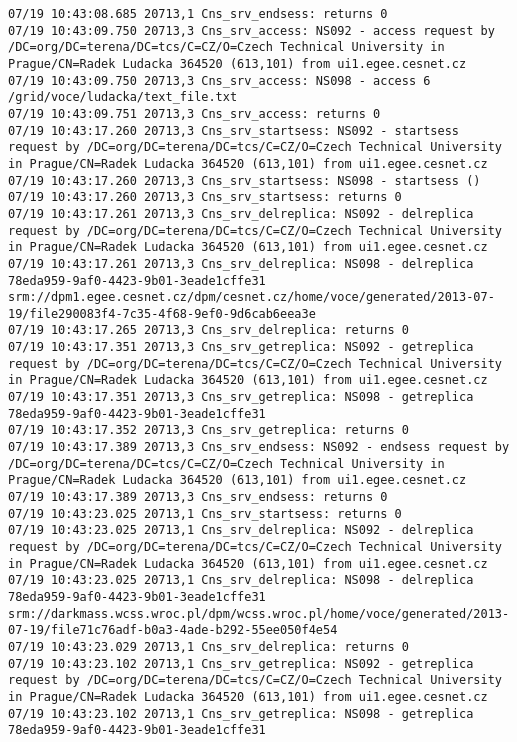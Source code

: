 \documentclass[a4paper, 11pt]{article} %
\begin{document}
\begin{lstlisting}[label={log:del3},caption={lcg-del -a lfn:/grid/voce/ludacka/text\_file.txt - deletes all replicas and alisses. In this example: deletes 2 replicas}]
07/19 10:43:08.685 20713,1 Cns_srv_endsess: returns 0
07/19 10:43:09.750 20713,3 Cns_srv_access: NS092 - access request by /DC=org/DC=terena/DC=tcs/C=CZ/O=Czech Technical University in Prague/CN=Radek Ludacka 364520 (613,101) from ui1.egee.cesnet.cz
07/19 10:43:09.750 20713,3 Cns_srv_access: NS098 - access 6 /grid/voce/ludacka/text_file.txt
07/19 10:43:09.751 20713,3 Cns_srv_access: returns 0
07/19 10:43:17.260 20713,3 Cns_srv_startsess: NS092 - startsess request by /DC=org/DC=terena/DC=tcs/C=CZ/O=Czech Technical University in Prague/CN=Radek Ludacka 364520 (613,101) from ui1.egee.cesnet.cz
07/19 10:43:17.260 20713,3 Cns_srv_startsess: NS098 - startsess ()
07/19 10:43:17.260 20713,3 Cns_srv_startsess: returns 0
07/19 10:43:17.261 20713,3 Cns_srv_delreplica: NS092 - delreplica request by /DC=org/DC=terena/DC=tcs/C=CZ/O=Czech Technical University in Prague/CN=Radek Ludacka 364520 (613,101) from ui1.egee.cesnet.cz
07/19 10:43:17.261 20713,3 Cns_srv_delreplica: NS098 - delreplica 78eda959-9af0-4423-9b01-3eade1cffe31 srm://dpm1.egee.cesnet.cz/dpm/cesnet.cz/home/voce/generated/2013-07-19/file290083f4-7c35-4f68-9ef0-9d6cab6eea3e
07/19 10:43:17.265 20713,3 Cns_srv_delreplica: returns 0
07/19 10:43:17.351 20713,3 Cns_srv_getreplica: NS092 - getreplica request by /DC=org/DC=terena/DC=tcs/C=CZ/O=Czech Technical University in Prague/CN=Radek Ludacka 364520 (613,101) from ui1.egee.cesnet.cz
07/19 10:43:17.351 20713,3 Cns_srv_getreplica: NS098 - getreplica  78eda959-9af0-4423-9b01-3eade1cffe31
07/19 10:43:17.352 20713,3 Cns_srv_getreplica: returns 0
07/19 10:43:17.389 20713,3 Cns_srv_endsess: NS092 - endsess request by /DC=org/DC=terena/DC=tcs/C=CZ/O=Czech Technical University in Prague/CN=Radek Ludacka 364520 (613,101) from ui1.egee.cesnet.cz
07/19 10:43:17.389 20713,3 Cns_srv_endsess: returns 0
07/19 10:43:23.025 20713,1 Cns_srv_startsess: returns 0
07/19 10:43:23.025 20713,1 Cns_srv_delreplica: NS092 - delreplica request by /DC=org/DC=terena/DC=tcs/C=CZ/O=Czech Technical University in Prague/CN=Radek Ludacka 364520 (613,101) from ui1.egee.cesnet.cz
07/19 10:43:23.025 20713,1 Cns_srv_delreplica: NS098 - delreplica 78eda959-9af0-4423-9b01-3eade1cffe31 srm://darkmass.wcss.wroc.pl/dpm/wcss.wroc.pl/home/voce/generated/2013-07-19/file71c76adf-b0a3-4ade-b292-55ee050f4e54
07/19 10:43:23.029 20713,1 Cns_srv_delreplica: returns 0
07/19 10:43:23.102 20713,1 Cns_srv_getreplica: NS092 - getreplica request by /DC=org/DC=terena/DC=tcs/C=CZ/O=Czech Technical University in Prague/CN=Radek Ludacka 364520 (613,101) from ui1.egee.cesnet.cz
07/19 10:43:23.102 20713,1 Cns_srv_getreplica: NS098 - getreplica  78eda959-9af0-4423-9b01-3eade1cffe31

\end{lstlisting}
\end{document}
